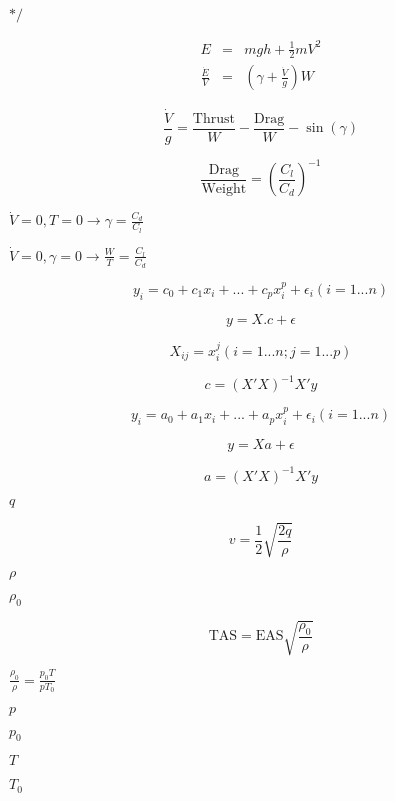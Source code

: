\documentclass{article}
\begin{document}
$*/$
\pagebreak

\begin{eqnarray*} E &=& mgh + \frac{1}{2}mV^2 \\ \frac{\dot{E}}{V} &=& \left(\gamma + \frac{\dot{V}}{g}\right) W \end{eqnarray*}
\pagebreak

\[ \frac{\dot{V}}{g} = \frac{\mbox{Thrust}}{W} - \frac{\mbox{Drag}}{W} - \sin(\gamma) \]
\pagebreak

\[ \frac{\mbox{Drag}}{\mbox{Weight}} = \left(\frac{C_l}{C_d}\right)^{-1} \]
\pagebreak

$\dot{V}=0, T=0 \rightarrow \gamma = \frac{C_d}{C_l}$
\pagebreak

$\dot{V}=0, \gamma=0 \rightarrow \frac{W}{T} = \frac{C_l}{C_d}$
\pagebreak

\[ y_i = c_0 + c_1 x_i + ... + c_p x_i^p + \epsilon_i (i = 1 ... n) \]
\pagebreak

\[ y = X.c + \epsilon \]
\pagebreak

\[ X_{ij} = x_i^j (i = 1 ... n; j = 1 ... p) \]
\pagebreak

\[ c = (X' X)^{-1} X' y \]
\pagebreak

\[ y_i = a_0 + a_1 x_i + ... + a_p x_i^p + \epsilon_i (i = 1 ... n) \]
\pagebreak

\[ y = Xa + \epsilon \]
\pagebreak

\[ a = (X' X)^{-1} X' y \]
\pagebreak

$q$
\pagebreak

\[ v = \frac12 \sqrt{\frac{2q}{\rho}} \]
\pagebreak

$\rho$
\pagebreak

$\rho_0$
\pagebreak

\[\mbox{TAS} = \mbox{EAS} \sqrt{\frac{\rho_0}{\rho}}\]
\pagebreak

$ \frac{\rho_0}{\rho} = \frac{p_0T}{pT_0}$
\pagebreak

$p$
\pagebreak

$p_0$
\pagebreak

$T$
\pagebreak

$T_0$
\pagebreak
\end{document}
